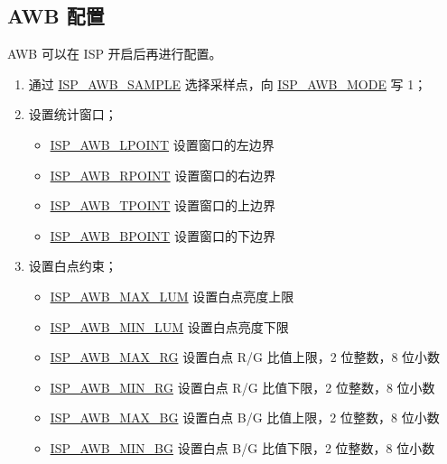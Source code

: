 \documentclass[main\_\_CN.tex]{subfiles}
\begin{document}
\subsection{AWB 配置}
AWB 可以在 ISP 开启后再进行配置。
\begin{enumerate}
    \item 通过 \hyperref[fielddesc:ISPAWBSAMPLE]{ISP\_AWB\_SAMPLE} 选择采样点，向 \hyperref[fielddesc:ISPAWBMODE]{ISP\_AWB\_MODE} 写 1；

    \item 设置统计窗口；
    \begin{itemize}
        \item \hyperref[fielddesc:ISPAWBLPOINT]{ISP\_AWB\_LPOINT} 设置窗口的左边界
        \item \hyperref[fielddesc:ISPAWBRPOINT]{ISP\_AWB\_RPOINT} 设置窗口的右边界
        \item \hyperref[fielddesc:ISPAWBTPOINT]{ISP\_AWB\_TPOINT} 设置窗口的上边界
        \item \hyperref[fielddesc:ISPAWBBPOINT]{ISP\_AWB\_BPOINT} 设置窗口的下边界
    \end{itemize}

    \item 设置白点约束；
    \begin{itemize}
        \item \hyperref[fielddesc:ISPAWBMAXLUM]{ISP\_AWB\_MAX\_LUM} 设置白点亮度上限
        \item \hyperref[fielddesc:ISPAWBMINLUM]{ISP\_AWB\_MIN\_LUM} 设置白点亮度下限
        \item \hyperref[fielddesc:ISPAWBMAXRG]{ISP\_AWB\_MAX\_RG} 设置白点 R/G 比值上限，2 位整数，8 位小数
        \item \hyperref[fielddesc:ISPAWBMINRG]{ISP\_AWB\_MIN\_RG} 设置白点 R/G 比值下限，2 位整数，8 位小数
        \item \hyperref[fielddesc:ISPAWBMAXBG]{ISP\_AWB\_MAX\_BG} 设置白点 B/G 比值上限，2 位整数，8 位小数
        \item \hyperref[fielddesc:ISPAWBMINBG]{ISP\_AWB\_MIN\_BG} 设置白点 B/G 比值下限，2 位整数，8 位小数
    \end{itemize}


\end{enumerate}
\end{document}
